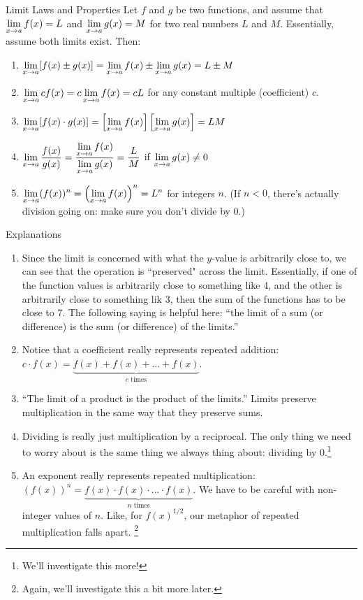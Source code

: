 \begin{imp}{Limit Laws and Properties}
  Let $f$ and $g$ be two functions, and assume that $\displaystyle \lim_{x\to a} f(x)=L$ and $\displaystyle \lim_{x\to a} g(x)=M$ for two real numbers $L$ and $M$. Essentially, assume both limits exist.
  Then:
  \begin{enumerate}
    \item $\displaystyle \lim_{x\to a} [f(x)\pm g(x)] = \lim_{x\to a} f(x) \pm \lim_{x\to a} g(x) = L\pm M$
    \item $\displaystyle \lim_{x\to a} cf(x) = c\lim_{x\to a} f(x)= cL$ for any constant multiple (coefficient) $c$.
    \item $\displaystyle \lim_{x\to a} [f(x)\cdot g(x)] = \left[\lim_{x\to a} f(x)\right] \left[\lim_{x\to a} g(x)\right] = LM$
    \item $\displaystyle \lim_{x\to a} \frac{f(x)}{g(x)} = \frac{\displaystyle \lim_{x\to a} f(x)}{\displaystyle \lim_{x\to a} g(x)} = \frac{L}{M}$ if $\displaystyle \lim_{x\to a} g(x)\neq0$
    \item $\displaystyle \lim_{x\to a} (f(x))^n = \left(\displaystyle \lim_{x\to a} f(x) \right)^n = L^n$ for integers $n$. (If $n<0$, there's actually division going on: make sure you don't divide by 0.)
  \end{enumerate}
\end{imp}

\begin{note}{Explanations}\hspace{1cm}
  \begin{enumerate}
    \item Since the limit is concerned with what the $y$-value is arbitrarily close to, we can see that the operation is ``preserved" across the limit.
    Essentially, if one of the function values is arbitrarily close to something like 4, and the other is arbitrarily close to something lik 3, then the sum of the functions has to be close to 7.
    The following saying is helpful here: ``the limit of a sum (or difference) is the sum (or difference) of the limits.''
    \item Notice that a coefficient really represents repeated addition: $c\cdot f(x) = \underbrace{f(x) + f(x) + ...+ f(x)}_{c \text{ times}}$.
    \item ``The limit of a product is the product of the limits.''
    Limits preserve multiplication in the same way that they preserve sums.
    \item Dividing is really just multiplication by a reciprocal.
    The only thing we need to worry about is the same thing we always thing about: dividing by 0.\footnote{We'll investigate this more!}
    \item An exponent really represents repeated multiplication: $(f(x))^n = \underbrace{f(x) \cdot f(x) \cdot ... \cdot f(x)}_{n \text{ times}}$. We have to be careful with non-integer values of $n$. Like, for $f(x)^{1/2}$, our metaphor of repeated multiplication falls apart. \footnote{Again, we'll investigate this a bit more later.}
  \end{enumerate}
\end{note}


